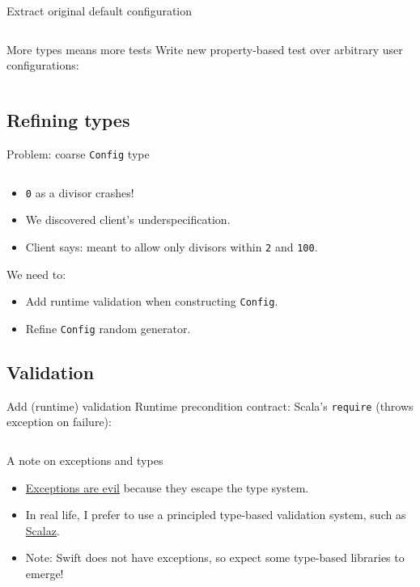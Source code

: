 \begin{frame}[fragile]{Extract original default configuration}
  \inputminted{scala}{Defaults1.scala}
\end{frame}

\begin{frame}[fragile]{More types means more tests}
  Write new property-based test over \alert{arbitrary} user configurations:
  \inputminted[gobble=2]{scala}{FizzBuzzSpec6.scala}
\end{frame}

\subsection{Refining types}

\begin{frame}[fragile]{Problem: coarse \texttt{Config} type}
  \inputminted{console}{testQuick6.console}

  \begin{itemize}
  \item \texttt{0} as a divisor \alert{crashes}!
  \item We discovered client's \alert{underspecification}.
  \item Client says: meant to allow only divisors within \texttt{2} and \texttt{100}.
  \end{itemize}

  We need to:
  \begin{itemize}
  \item Add runtime \alert{validation} when \alert{constructing} \texttt{Config}.
  \item Refine \texttt{Config} random generator.
  \end{itemize}
\end{frame}

\subsection{Validation}

\begin{frame}[fragile]{Add (runtime) validation}
  \alert{Runtime} precondition contract: Scala's \texttt{require} (throws exception on failure):

  \inputminted[gobble=2]{scala}{FizzBuzz3Validate.scala}
\end{frame}

\begin{frame}{A note on exceptions and types}
  \begin{itemize}
  \item \href{http://blog.jessitron.com/2013/06/whats-dirtier-than-comments-exceptions.html}{Exceptions are evil} because they escape the type system.
  \item In real life, I prefer to use a principled \alert{type-based} validation system, such as \href{http://eed3si9n.com/learning-scalaz/Validation.html}{Scalaz}.
  \item Note: Swift does not have exceptions, so expect some type-based libraries to emerge!
  \end{itemize}
\end{frame}

